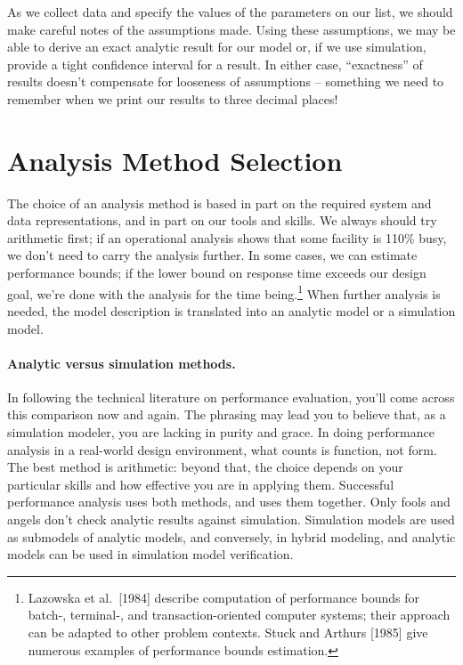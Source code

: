 As we collect data and specify the values of the parameters on our list, we
should make careful notes of the assumptions made. Using these assumptions,
we may be able to derive an exact analytic result for our model or, if we use
simulation, provide a tight confidence interval for a result. In either case,
``exactness'' of results doesn't compensate for looseness of assumptions --
something we need to remember when we print our results to three decimal
places!

\section{Analysis Method Selection}
\label{sec:analysis-method-selection}

The choice of an analysis method is based in part on the required system and
data representations, and in part on our tools and skills. We always should
try arithmetic first; if an operational analysis shows that some facility is
110\% busy, we don't need to carry the analysis further. In some cases, we can
estimate performance bounds; if the lower bound on response time exceeds our
design goal, we're done with the analysis for the time being.\footnote{Lazowska
et al.\ [1984] describe computation of performance bounds for batch-, terminal-,
and transaction-oriented computer systems; their approach can be adapted to
other problem contexts. Stuck and Arthurs [1985] give numerous examples of
performance bounds estimation.} When further analysis is needed, the model
description is translated into an analytic model or a simulation model.

\paragraph{Analytic versus simulation methods.}
In following the technical literature on performance evaluation, you'll come
across this comparison now and again. The phrasing may lead you to believe
that, as a simulation modeler, you are lacking in purity and grace. In doing
performance analysis in a real-world design environment, what counts is
function, not form. The best method is arithmetic: beyond that, the choice
depends on your particular skills and how effective you are in applying them.
Successful performance analysis uses both methods, and uses them together.
Only fools and angels don't check analytic results against simulation.
Simulation models are used as submodels of analytic models, and conversely, in
hybrid modeling, and analytic models can be used in simulation model
verification.

